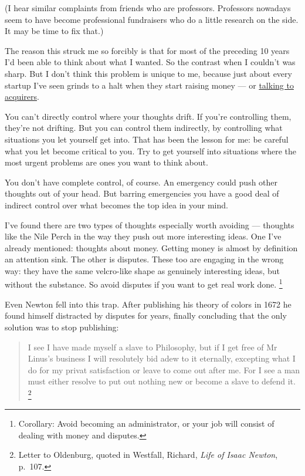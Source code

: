 (I hear similar complaints from friends who are professors. Professors
nowadays seem to have become professional fundraisers who do a little
research on the side. It may be time to fix that.)

The reason this struck me so forcibly is that for most of the preceding
10 years I'd been able to think about what I wanted. So the contrast
when I couldn't was sharp. But I don't think this problem is unique to
me, because just about every startup I've seen grinds to a halt when
they start raising money --- or \href{corpdev.html}{talking to
acquirers}.

You can't directly control where your thoughts drift. If you're
controlling them, they're not drifting. But you can control them
indirectly, by controlling what situations you let yourself get into.
That has been the lesson for me: be careful what you let become critical
to you. Try to get yourself into situations where the most urgent
problems are ones you want to think about.

You don't have complete control, of course. An emergency could push
other thoughts out of your head. But barring emergencies you have a good
deal of indirect control over what becomes the top idea in your mind.

I've found there are two types of thoughts especially worth avoiding ---
thoughts like the Nile Perch in the way they push out more interesting
ideas. One I've already mentioned: thoughts about money. Getting money
is almost by definition an attention sink. The other is disputes. These
too are engaging in the wrong way: they have the same velcro-like shape
as genuinely interesting ideas, but without the substance. So avoid
disputes if you want to get real work done. \footnote{Corollary: Avoid becoming an administrator, or your job will
consist of dealing with money and disputes.}

Even Newton fell into this trap. After publishing his theory of colors
in 1672 he found himself distracted by disputes for years, finally
concluding that the only solution was to stop publishing:

\begin{quote}
I see I have made myself a slave to Philosophy, but if I get free of Mr
Linus's business I will resolutely bid adew to it eternally, excepting
what I do for my privat satisfaction or leave to come out after me. For
I see a man must either resolve to put out nothing new or become a slave
to defend it. \footnote{Letter to Oldenburg, quoted in Westfall, Richard, \emph{Life of
Isaac Newton}, p.~107.}
\end{quote}

